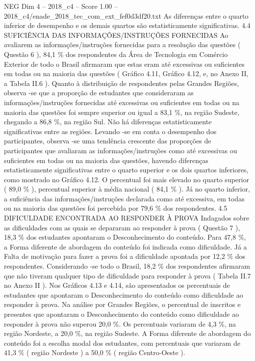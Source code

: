 \begin{textsample}{NEG Dim 4 – 2018\_c4 – Score 1.00 – 2018\_c4/enade\_2018\_tec\_com\_ext\_fef0d3df20.txt}
As diferenças entre o quarto inferior de desempenho e os demais quartos são estatisticamente significativas. 4.4 SUFICIÊNCIA DAS INFORMAÇÕES/INSTRUÇÕES FORNECIDAS Ao avaliarem as informações/instruções fornecidas para a resolução das questões ( Questão 6 ), 84,1 \% dos respondentes da Área de Tecnologia em Comércio Exterior de todo o Brasil afirmaram que estas eram até excessivas ou suficientes em todas ou na maioria das questões ( Gráfico 4.11, Gráfico 4.12, e, no Anexo II, a Tabela II.6 ).
Quanto à distribuição de respondentes pelas Grandes Regiões, observa -se que a proporção de estudantes que consideraram as informações/instruções fornecidas até excessivas ou suficientes em todas ou na maioria das questões foi sempre superior ou igual a 83,1 \%, na região Sudeste, chegando a 86,8 \%, na região Sul.
Não há diferenças estatisticamente significativas entre as regiões.
Levando -se em conta o desempenho dos participantes, observa -se uma tendência crescente das proporções de participantes que avaliaram as informações/instruções como até excessivas ou suficientes em todas ou na maioria das questões, havendo diferenças estatisticamente significativas entre o quarto superior e os dois quartos inferiores, como mostrado no Gráfico 4.12.
O percentual foi mais elevado no quarto superior ( 89,0 \% ), percentual superior à média nacional ( 84,1 \% ).
Já no quarto inferior, a suficiência das informações/instruções declarada como até excessiva, em todas ou na maioria das questões foi percebida por 79,6 \% dos respondentes. 4.5 DIFICULDADE ENCONTRADA AO RESPONDER À PROVA Indagados sobre as dificuldades com as quais se depararam ao responder à prova ( Questão 7 ), 18,3 \% dos estudantes apontaram o Desconhecimento do conteúdo.
Para 47,8 \%, a Forma diferente de abordagem do conteúdo foi indicada como dificuldade.
Já a Falta de motivação para fazer a prova foi a dificuldade apontada por 12,2 \% dos respondentes.
Considerando -se todo o Brasil, 18,2 \% dos respondentes afirmaram que não tiveram qualquer tipo de dificuldade para responder à prova ( Tabela II.7 no Anexo II ).
Nos Gráficos 4.13 e 4.14, são apresentados os percentuais de estudantes que apontaram o Desconhecimento do conteúdo como dificuldade ao responder à prova.
Na análise por Grandes Regiões, o percentual de inscritos e presentes que apontaram o Desconhecimento do conteúdo como dificuldade ao responder à prova não superou 20,0 \%.
Os percentuais variaram de 4,3 \%, na região Nordeste, a 20,0 \%, na região Sudeste.
A Forma diferente de abordagem do conteúdo foi a escolha modal dos estudantes, com percentuais que variaram de 41,3 \% ( região Nordeste ) a 50,0 \% ( região Centro-Oeste ).

\end{textsample}
